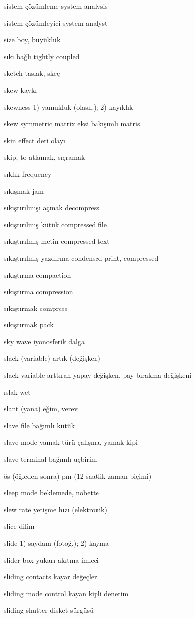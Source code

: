 \documentclass[12pt,fleqn]{article}\usepackage{../../common}
\begin{document}
sistem çözümleme system analysis

sistem çözümleyici system analyst

size boy, büyüklük

sıkı bağlı tightly coupled

sketch taslak, skeç

skew kaykı

skewness 1) yamukluk (olasıl.); 2) kayıklık

skew symmetric matrix eksi bakışımlı matris

skin effect deri olayı

skip, to atlamak, sıçramak

sıklık frequency

sıkışmak jam

sıkıştırılmışı açmak decompress

sıkıştırılmış kütük compressed file

sıkıştırılmış metin compressed text

sıkıştırılmış yazdırma condensed print, compressed

sıkıştırma compaction

sıkıştırma compression

sıkıştırmak compress

sıkıştırmak pack

sky wave iyonosferik dalga

slack (variable) artık (değişken)

slack variable arttıran yapay değişken, pay bırakma değişkeni

ıslak wet

slant (yana) eğim, verev

slave file bağımlı kütük

slave mode yamak türü çalışma, yamak kipi

slave terminal bağımlı uçbirim

ös (öğleden sonra) pm (12 saatlik zaman biçimi)

sleep mode beklemede, nöbette

slew rate yetişme hızı (elektronik)

slice dilim

slide 1) saydam (fotoğ.); 2) kayma

slider box yukarı akıtma imleci

sliding contacts kayar değeçler

sliding mode control kayan kipli denetim

sliding shutter disket sürgüsü
\end{document}

